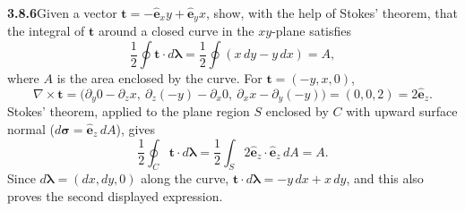 \par\bigskip
\noindent\textbf{3.8.6}\quad Given a vector
$\mathbf{t}=-\hat{\mathbf{e}}_{x}y+\hat{\mathbf{e}}_{y}x$, show, with the help
of Stokes' theorem, that the integral of $\mathbf{t}$ around a 
closed curve in the $xy$-plane satisfies
\[
\frac{1}{2}\oint\mathbf{t}\cdot d\boldsymbol{\lambda}
=\frac{1}{2}\oint(x\,dy-y\,dx)=A,
\]
where $A$ is the area enclosed by the curve.
\solution
{}
For $\mathbf t=(-y,x,0)$,
\[
\nabla\times\mathbf t=\bigl(\partial_y0-\partial_zx,\
\partial_z(-y)-\partial_x0,\ \partial_xx-\partial_y(-y)\bigr)
=(0,0,2)=2\hat{\mathbf e}_z.
\]
Stokes' theorem, applied to the plane region $S$ enclosed by $C$ with
upward surface normal ($d\boldsymbol\sigma=\hat{\mathbf e}_z\,dA$),
gives
\[
\frac12\oint_C\mathbf t\cdot d\boldsymbol\lambda
=\frac12\int_S2\hat{\mathbf e}_z\cdot\hat{\mathbf e}_z\,dA
=\boxed A.
\]
Since $d\boldsymbol\lambda=(dx,dy,0)$ along the curve,
$\mathbf t\cdot d\boldsymbol\lambda=-y\,dx+x\,dy$,
and this also proves the second displayed expression.


